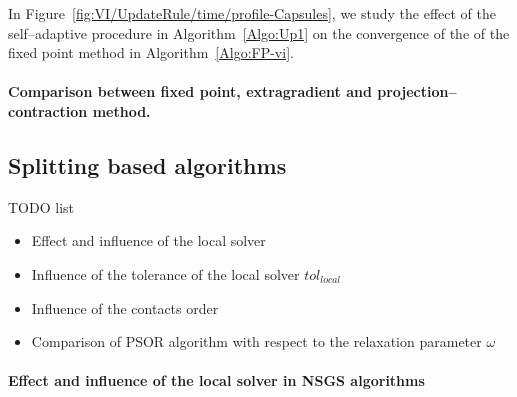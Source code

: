 In Figure~\ref{fig:VI/UpdateRule/time/profile-Capsules}, we study the effect of the self--adaptive procedure in Algorithm~\ref{Algo:Up1} on the convergence of the of the fixed point method in Algorithm~\ref{Algo:FP-vi}.


\paragraph{Comparison between fixed point, extragradient and projection--contraction method.}



\subsection{Splitting based algorithms}

\begin{ndrva}
TODO list
\begin{itemize}
\item Effect and influence of the local solver
\item Influence of the tolerance of the local solver $tol_{local}$
\item Influence of the contacts order
\item Comparison of PSOR algorithm with respect to the relaxation parameter $\omega$
\end{itemize}
\end{ndrva}

\paragraph{Effect and influence of the local solver in NSGS algorithms}



